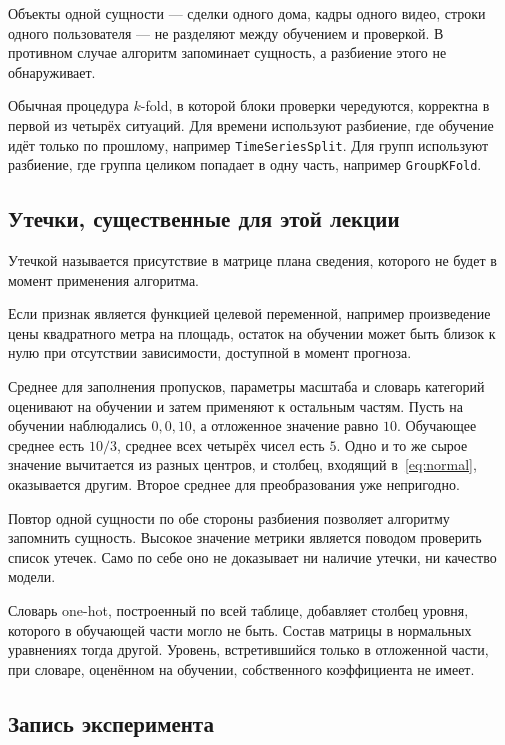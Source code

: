 \documentclass[11pt,a4paper]{article}
\begin{document}
Объекты одной сущности --- сделки одного дома, кадры одного видео, строки одного пользователя --- не разделяют между обучением и проверкой. В противном случае алгоритм запоминает сущность, а разбиение этого не обнаруживает.

Обычная процедура \(k\)-fold, в которой блоки проверки чередуются, корректна в первой из четырёх ситуаций. Для времени используют разбиение, где обучение идёт только по прошлому, например \texttt{TimeSeriesSplit}. Для групп используют разбиение, где группа целиком попадает в одну часть, например \texttt{GroupKFold}.

\subsection{Утечки, существенные для этой лекции}

Утечкой называется присутствие в матрице плана сведения, которого не будет в момент применения алгоритма.

Если признак является функцией целевой переменной, например произведение цены квадратного метра на площадь, остаток на обучении может быть близок к нулю при отсутствии зависимости, доступной в момент прогноза.

Среднее для заполнения пропусков, параметры масштаба и словарь категорий оценивают на обучении и затем применяют к остальным частям. Пусть на обучении наблюдались \(0,0,10\), а отложенное значение равно \(10\). Обучающее среднее есть \(10/3\), среднее всех четырёх чисел есть \(5\). Одно и то же сырое значение вычитается из разных центров, и столбец, входящий в~\eqref{eq:normal}, оказывается другим. Второе среднее для преобразования уже непригодно.

Повтор одной сущности по обе стороны разбиения позволяет алгоритму запомнить сущность. Высокое значение метрики является поводом проверить список утечек. Само по себе оно не доказывает ни наличие утечки, ни качество модели.

\begin{warnbox}
Словарь one-hot, построенный по всей таблице, добавляет столбец уровня, которого в обучающей части могло не быть. Состав матрицы в нормальных уравнениях тогда другой. Уровень, встретившийся только в отложенной части, при словаре, оценённом на обучении, собственного коэффициента не имеет.
\end{warnbox}

\subsection{Запись эксперимента}
\end{document}
